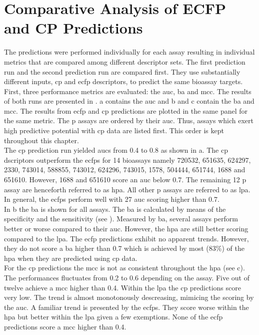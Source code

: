 \section{Comparative Analysis of ECFP and CP Predictions}\label{sec:companalyfpcp}
The predictions were performed individually for each assay resulting in individual metrics that are compared among different descriptor sets. The first prediction run and the second prediction run are compared first. They use substantially different inputs, \ac{cp} and \ac{ecfp} descriptors, to predict the same bioassay targets. First, three performance metrics are evaluated: the \ac{auc}, \ac{ba} and \ac{mcc}. The results of both runs are presented in . a contains the \ac{auc} and b and c contain the \acl{ba} and \acl{mcc}. The results from \ac{ecfp} and \ac{cp} predictions are plotted in the same panel for the same metric. The \acl{p} assays are ordered by their \ac{auc}. Thus, assays which exert high predictive potential with \ac{cp} data are listed first. This order is kept throughout this chapter.\\
The \ac{cp} prediction run yielded \acp{auc} from \num{0.4} to \num{0.8} as shown in a. The \ac{cp} dscriptors outperform the \acp{ecfp} for 14 bioassays namely 720532, 651635, 624297, 2330, 743014, 588855, 743012, 624296, 743015, 1578, 504444, 651744, 1688 and 651610. However, 1688 and 651610 score an \ac{auc} below \num{0.7}. The remaining 12 \acl{p} assay are henceforth referred to as \acl{hpa}. All other \acl{p} assays are referred to as \acl{lpa}. In general, the \acp{ecfp} perform well with 27 \ac{auc} scoring higher than \num{0.7}.\\
In b the \acl{ba} is shown for all assays. The \acl{ba} is calculated by means of the specificity and the sensitivity (see ). Measured by \acl{ba}, several assays perform better or worse compared to their \ac{auc}. However, the \acl{hpa} are still better scoring compared to the \acl{lpa}. The \ac{ecfp} predictions exhibit no apparent trends. However, they do not score a \acl{ba} higher than \num{0.7} which is achieved by most (83\%) of the \acl{hpa} when they are predicted using \ac{cp} data.\\
For the \ac{cp} predictions the \acl{mcc} is not as consistent throughout the \acl{hpa} (see c). The performances fluctuates from \num{0.2} to \num{0.6} depending on the assay. Five out of twelve achieve a \acl{mcc} higher than \num{0.4}. Within the \acl{lpa} the \ac{cp} predictions score very low. The trend is almost monotonously descreasing, mimicing the scoring by the \ac{auc}. A familiar trend is presented by the \acp{ecfp}. They score worse within the \acl{hpa} but better within the \acl{lpa} given a few exemptions. None of the \ac{ecfp} predictions score a \acl{mcc} higher than \num{0.4}.\\
